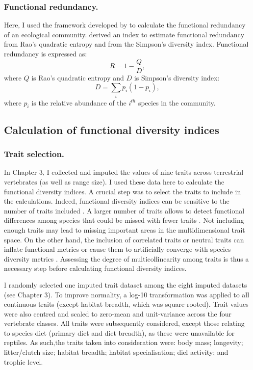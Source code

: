 \subsubsection{Functional redundancy.}
Here, I used the framework developed by \citet{Ricotta2016} to calculate the functional redundancy of an ecological community. \citet{Ricotta2016} derived an index to estimate functional redundancy from Rao's quadratic entropy and from the Simpson's diversity index. Functional redundancy is expressed as:
\begin{equation}
R=1-\frac{Q}{D},
\label{eqFRed}
\end{equation} 
where $Q$ is Rao's quadratic entropy and $D$ is Simpson's diversity index:
\begin{equation}
D=\sum_{i}p_{i}(1-p_{i}),
\end{equation} 
where $p_{i}$ is the relative abundance of the $i^{th}$ species in the community.

\subsection{Calculation of functional diversity indices}

\subsubsection{Trait selection.}
In Chapter 3, I collected and imputed the values of nine traits across terrestrial vertebrates (as well as range size). I used these data here to calculate the functional diversity indices. A crucial step was to select the traits to include in the calculations. Indeed, functional diversity indices can be sensitive to the number of traits included \citep{Mouillot2014, Cadotte2011}. A larger number of traits allows to detect functional differences among species that could be missed with fewer traits \citep{Petchey2002}. Not including enough traits may lead to missing important areas in the multidimensional trait space. On the other hand, the inclusion of correlated traits or neutral traits can inflate functional metrics or cause them to artificially converge with species diversity metrics \citep{Cadotte2011, Naeem2003}. Assessing the degree of multicollinearity among traits is thus a necessary step before calculating functional diversity indices. 

I randomly selected one imputed trait dataset among the eight imputed datasets (see Chapter 3). To improve normality, a log-10 transformation was applied to all continuous traits (except habitat breadth, which was square-rooted). Trait values were also centred and scaled to zero-mean and unit-variance across the four vertebrate classes. All traits were subsequently considered, except those relating to species diet (primary diet and diet breadth), as these were unavailable for reptiles. As such,the traits taken into consideration were: body mass; longevity; litter/clutch size; habitat breadth; habitat specialisation; diel activity; and trophic level.

